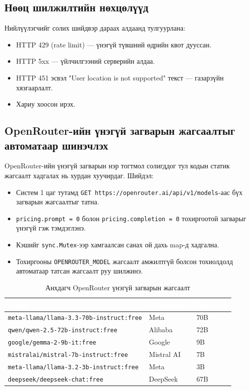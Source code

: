 \subsection{Нөөц шилжилтийн нөхцөлүүд}
Нийлүүлэгчийг солих шийдвэр дараах алдаанд тулгуурлана:
\begin{itemize}
    \item HTTP 429 (rate limit) --- үнэгүй түвшний өдрийн квот дууссан.
    \item HTTP 5xx --- үйлчилгээний серверийн алдаа.
    \item HTTP 451 эсвэл "User location is not supported" текст --- газарзүйн хязгаарлалт.
    \item Хариу хоосон ирэх.
\end{itemize}

\subsection{OpenRouter-ийн үнэгүй загварын жагсаалтыг автоматаар шинэчлэх}
OpenRouter-ийн үнэгүй загварын нэр тогтмол солигддог тул кодын статик жагсаалт хадгалах нь хурдан хуучирдаг. Шийдэл:
\begin{itemize}
    \item Систем 1 цаг тутамд \texttt{GET https://openrouter.ai/api/v1/models}-аас бүх загварын жагсаалтыг татна.
    \item \texttt{pricing.prompt = 0} болон \texttt{pricing.completion = 0} тохиргоотой загварыг үнэгүй гэж тэмдэглэнэ.
    \item Кэшийг \texttt{sync.Mutex}-ээр хамгаалсан санах ой дахь map-д хадгална.
    \item Тохиргооны \texttt{OPENROUTER\_MODEL} жагсаалт амжилтгүй болсон тохиолдолд автоматаар татсан жагсаалт руу шилжинэ.
\end{itemize}

\begin{table}[ht]
\centering
\footnotesize
\renewcommand{\arraystretch}{1.25}
\begin{tabular}{|p{6.5cm}|p{2.5cm}|p{2.6cm}|}
\hline
\rowcolor{darknavy}
\textcolor{white}{\textbf{Загвар}} & \textcolor{white}{\textbf{Үйлдвэрлэгч}} & \textcolor{white}{\textbf{Параметр}} \\ \hline
\texttt{meta-llama/llama-3.3-70b-instruct:free}    & Meta       & 70B \\ \hline
\texttt{qwen/qwen-2.5-72b-instruct:free}           & Alibaba    & 72B \\ \hline
\texttt{google/gemma-2-9b-it:free}                 & Google     & 9B  \\ \hline
\texttt{mistralai/mistral-7b-instruct:free}        & Mistral AI & 7B  \\ \hline
\texttt{meta-llama/llama-3.2-3b-instruct:free}     & Meta       & 3B  \\ \hline
\texttt{deepseek/deepseek-chat:free}               & DeepSeek   & 67B \\ \hline
\end{tabular}
\caption{Анхдагч OpenRouter үнэгүй загварын жагсаалт}
\label{tab:or-models}
\end{table}


